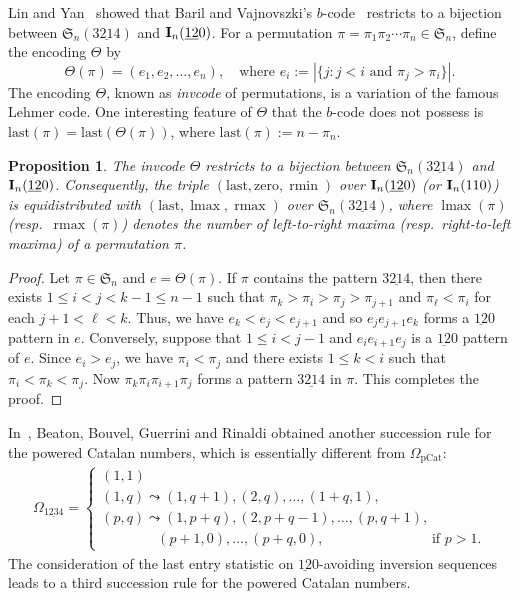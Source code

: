 \documentclass[12pt,A4]{amsart}
\numberwithin{equation}{section}
\theoremstyle{plain}
\newtheorem{proposition}[theorem]{Proposition}
\theoremstyle{definition}
\def\S{\mathfrak{S}}
\def\last{\mathrm{last}}
\def\zero{\mathrm{zero}}
\def\I{\operatorname{{\bf I}}}
\def\rmin{\operatorname{rmin}}
\def\rmax{\operatorname{rmax}}
\def\lmax{\operatorname{lmax}}
\begin{document}
Lin and Yan~\cite[Lem.~2.19]{ly} showed that Baril and Vajnovszki's $b$-code~\cite{bv} restricts  to  a bijection between $\S_n(3\underline{21}4)$ and $\I_n(\underline{12}0)$. 
 For a permutation $\pi=\pi_1\pi_2\cdots\pi_n\in\S_n$, define the encoding $\Theta$ by
$$
\Theta(\pi)=(e_1,e_2,\ldots,e_n),\quad\text{where $e_i:=\left|\{j: \text{$j<i$ and $\pi_j>\pi_i$}\}\right|$}.
$$
The encoding $\Theta$,  known as {\em invcode} of permutations, is a variation of the famous Lehmer code. 
One interesting feature of $\Theta$ that the $b$-code does not possess is
$\last(\pi)=\last(\Theta(\pi))$,
where $\last(\pi):=n-\pi_n$.

\begin{proposition}
The invcode $\Theta$ restricts to a bijection between $\S_n(3\underline{21}4)$ and $\I_n(\underline{12}0)$. 
Consequently, the triple  $(\last,\zero,\rmin)$ over $\I_n(\underline{12}0)$ (or  $\I_n(110)$) is equidistributed with $(\last,\lmax,\rmax)$ over $\S_n(3\underline{21}4)$, where $\lmax(\pi)$ (resp.~$\rmax(\pi)$) denotes  the number of left-to-right maxima (resp.~right-to-left maxima) of a permutation $\pi$.
\end{proposition}
\begin{proof}
Let $\pi\in\S_n$ and $e=\Theta(\pi)$. If $\pi$ contains the pattern $3\underline{21}4$, then there exists $1\leq i<j<k-1\leq n-1$ such that  $\pi_k>\pi_i>\pi_j>\pi_{j+1}$ and $\pi_{\ell}<\pi_i$ for each $j+1<\ell<k$. 
Thus, we have  $e_k<e_j<e_{j+1}$ and so $e_je_{j+1}e_k$ forms a $\underline{12}0$ pattern in $e$. Conversely, suppose that $1\leq i<j-1$ and $e_ie_{i+1}e_j$ is a $\underline{12}0$ pattern of $e$. Since $e_i>e_j$, we have $\pi_i<\pi_j$ and there exists $1\leq k<i$ such that $\pi_i<\pi_k<\pi_j$. Now $\pi_k\pi_i\pi_{i+1}\pi_j$ forms a pattern $3\underline{21}4$ in $\pi$. This completes the proof.
\end{proof}

In~\cite[Prop.~25]{bbgr}, Beaton, Bouvel, Guerrini and Rinaldi obtained another succession rule for the powered Catalan numbers, which is essentially different from $\Omega_{\mathrm{pCat}}$:
\begin{align*}
\Omega_{\mathrm{1\underline{23}4}}=\begin{cases}
(1,1) \\
(1,q) \leadsto (1,q+1), (2,q),\ldots,(1+q,1),\\
(p,q)\leadsto (1,p+q), (2,p+q-1),\ldots,(p,q+1),\\
\qquad\qquad (p+1,0),\dots,(p+q,0),\qquad\qquad\qquad\,\,\,\,\quad\text{if $p>1$}.
\end{cases}
\end{align*} 
The consideration of the last entry statistic on $\underline{12}0$-avoiding inversion sequences leads to a third succession rule for the powered Catalan numbers. 
\end{document}
